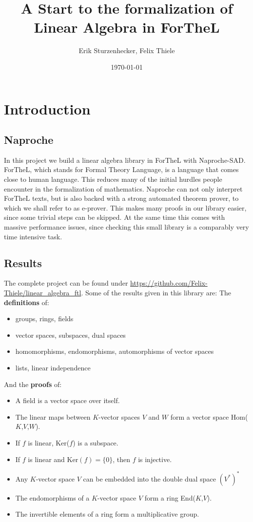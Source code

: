 \documentclass[11pt]{article}
\author{Erik Sturzenhecker, Felix Thiele}
\title{A Start to the formalization of Linear Algebra in ForTheL}
\date{\today}
\begin{document}
\maketitle
\newpage 
\setcounter{tocdepth}{10}
\tableofcontents

\newpage 
\section{Introduction}
\subsection{Naproche}
In this project we build a linear algebra library in ForTheL with Naproche-SAD. ForTheL, which stands for Formal Theory Language, is a language that comes close to human language. This reduces many of the initial hurdles people encounter in the formalization of mathematics. Naproche can not only interpret ForTheL texts, but is also backed with a strong automated theorem prover, to which we shall refer to as e-prover. This makes many proofs in our library easier, since some trivial steps can be skipped. At the same time this comes with massive performance issues, since checking this small library is a comparably very time intensive task.

\subsection{Results}
The complete project can be found under \url{https://github.com/Felix-Thiele/linear_algebra_ftl}.
Some of the results given in this library are:
\newline
The \textbf{definitions} of:
\begin{itemize}[nolistsep, noitemsep]
\item groups, rings, fields
\item vector spaces, subspaces, dual spaces
\item homomorphisms, endomorphisms, automorphisms of vector spaces
\item lists, linear independence
\end{itemize}
And the \textbf{proofs} of:
\begin{itemize}[nolistsep, noitemsep]
\item A field is a vector space over itself.
\item The linear maps between $K$-vector spaces $V$ and $W$ form a vector space Hom($K$,$V$,$W$).
\item If $f$ is linear, Ker($f$) is a subspace.
\item If $f$ is linear and Ker$(f)=\{0\}$, then $f$ is injective.
\item Any $K$-vector space $V$ can be embedded into the double dual space $(V^{*})^{*}$
\item The endomorphisms of a $K$-vector space $V$ form a ring End($K$,$V$).
\item The invertible elements of a ring form a multiplicative group.
\end{itemize}
\end{document}
